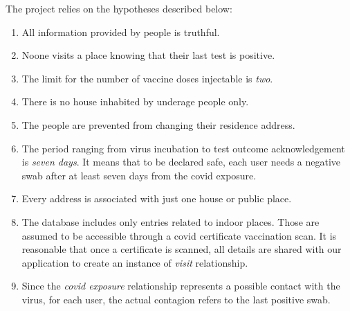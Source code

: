 \label{section 2}
The project relies on the hypotheses described below:

\begin{enumerate}
    \item All information provided by people is truthful.
    \item \label{assumption_2} Noone visits a place knowing that their last test is positive. 
    \item The limit for the number of vaccine doses injectable is \emph{two}.
    \item There is no house inhabited by underage people only.
    \item The people are prevented from changing their residence address.
    \item The period ranging from virus incubation to test outcome acknowledgement is \emph{seven days}. It means that to be declared safe, each user needs a negative swab after at least seven days from the covid exposure.
    \item Every address is associated with just one house or public place.
    \item The database includes only entries related to indoor places. Those are assumed to be accessible through a covid certificate vaccination scan. It is reasonable that once a certificate is scanned, all details are shared with our application to create an instance of \textit{visit} relationship. 
    \item Since the \textit{covid exposure} relationship represents a possible contact with the virus, for each user, the actual contagion refers to the last positive swab. 
\end{enumerate}    
    
